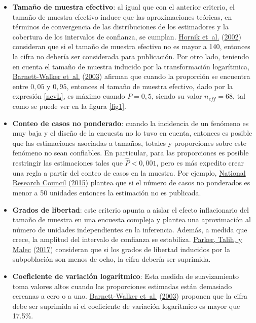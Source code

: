 \documentclass[
  12pt,
  spanish,
]{book}
\begin{document}
\begin{itemize}
\item
  \textbf{Tamaño de muestra efectivo}: al igual que con el anterior criterio, el tamaño de muestra efectivo induce que las aproximaciones teóricas, en términos de convergencia de las distribuciones de los estimadores y la cobertura de los intervalos de confianza, se cumplan. \protect\hyperlink{ref-Hornik_Maklan_Cadell_Prado_Barmada_Jacobsohn_Orwin_Sridharan_Zador_Southwell_etal}{Hornik et~al.} (\protect\hyperlink{ref-Hornik_Maklan_Cadell_Prado_Barmada_Jacobsohn_Orwin_Sridharan_Zador_Southwell_etal}{2002}) consideran que si el tamaño de muestra efectivo no es mayor a 140, entonces la cifra no debería ser considerada para publicación. Por otro lado, teniendo en cuenta el tamaño de muestra inducido por la transformación logarítmica, \protect\hyperlink{ref-Barnett_Walker_Chromy_Davis_Emrich_Odom_Packer_2003}{Barnett-Walker et~al.} (\protect\hyperlink{ref-Barnett_Walker_Chromy_Davis_Emrich_Odom_Packer_2003}{2003}) afirman que cuando la proporción se encuentra entre \(0,05\) y \(0,95\), entonces el tamaño de muestra efectivo, dado por la expresión \eqref{ncvL}, es máximo cuando \(P = 0,5\), siendo su valor \(n_{eff} = 68\), tal como se puede ver en la figura \ref{fig1}.
\item
  \textbf{Conteo de casos no ponderado}: cuando la incidencia de un fenómeno es muy baja y el diseño de la encuesta no lo tuvo en cuenta, entonces es posible que las estimaciones asociadas a tamaños, totales y proporciones sobre este fenómeno no sean confiables. En particular, para las proporciones es posible restringir las estimaciones tales que \(\hat P <0,001\), pero es más expedito crear una regla a partir del conteo de casos en la muestra. Por ejemplo, \protect\hyperlink{ref-AmericanCommunitySurvey}{National Research Council} (\protect\hyperlink{ref-AmericanCommunitySurvey}{2015}) plantea que si el número de casos no ponderados es menor a 50 unidades entonces la estimación no es publicada.
\item
  \textbf{Grados de libertad}: este criterio apunta a aislar el efecto inflacionario del tamaño de muestra en una encuesta compleja y plantea una aproximación al número de unidades independientes en la inferencia. Además, a medida que crece, la amplitud del intervalo de confianza se estabiliza. \protect\hyperlink{ref-Parker_Talih_Malec_2017}{Parker, Talih, y Malec} (\protect\hyperlink{ref-Parker_Talih_Malec_2017}{2017}) consideran que si los grados de libertad inducidos por la subpoblación son menos de ocho, la cifra debería ser suprimida.
\item
  \textbf{Coeficiente de variación logarítmico}: Esta medida de suavizamiento toma valores altos cuando las proporciones estimadas están demasiado cercanas a cero o a uno. \protect\hyperlink{ref-Barnett_Walker_Chromy_Davis_Emrich_Odom_Packer_2003}{Barnett-Walker et~al.} (\protect\hyperlink{ref-Barnett_Walker_Chromy_Davis_Emrich_Odom_Packer_2003}{2003}) proponen que la cifra debe ser suprimida si el coeficiente de variación logarítmico es mayor que 17.5\%.
\end{itemize}
\end{document}
